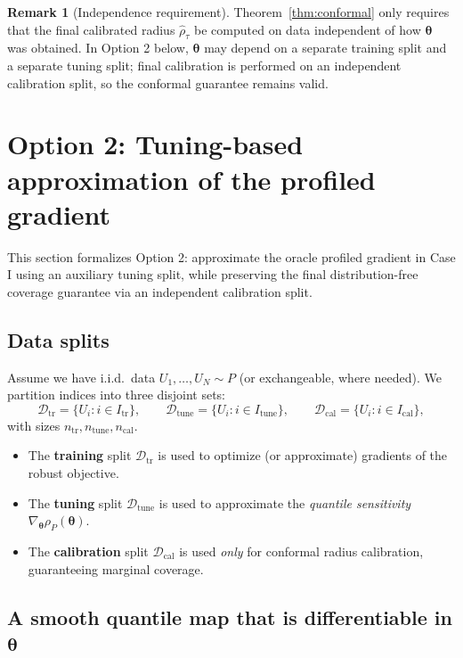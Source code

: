 \documentclass[11pt]{article}
\newcommand{\cD}{\mathcal{D}}
\newcommand{\btheta}{\bm{\theta}}
\theoremstyle{plain}
\theoremstyle{definition}
\newtheorem{remark}[theorem]{Remark}
\begin{document}
\begin{remark}[Independence requirement]\label{rem:indep}
Theorem~\ref{thm:conformal} only requires that the final calibrated radius $\hat\rho_\tau$ be computed on data independent of how $\btheta$ was obtained.
In Option 2 below, $\btheta$ may depend on a separate training split and a separate tuning split; final calibration is performed on an independent calibration split, so the conformal guarantee remains valid.
\end{remark}

\section{Option 2: Tuning-based approximation of the profiled gradient}

This section formalizes Option 2: approximate the oracle profiled gradient in Case I using an auxiliary tuning split, while preserving the final distribution-free coverage guarantee via an independent calibration split.

\subsection{Data splits}

Assume we have i.i.d.\ data $U_1,\dots,U_N\sim P$ (or exchangeable, where needed).
We partition indices into three disjoint sets:
\[
\cD_{\mathrm{tr}}=\{U_i: i\in I_{\mathrm{tr}}\},\qquad
\cD_{\mathrm{tune}}=\{U_i: i\in I_{\mathrm{tune}}\},\qquad
\cD_{\mathrm{cal}}=\{U_i: i\in I_{\mathrm{cal}}\},
\]
with sizes $n_{\mathrm{tr}}, n_{\mathrm{tune}}, n_{\mathrm{cal}}$.

\begin{itemize}[leftmargin=2em, itemsep=1pt]
\item The \textbf{training} split $\cD_{\mathrm{tr}}$ is used to optimize (or approximate) gradients of the robust objective.
\item The \textbf{tuning} split $\cD_{\mathrm{tune}}$ is used to approximate the \emph{quantile sensitivity} $\nabla_{\btheta}\rho_P(\btheta)$.
\item The \textbf{calibration} split $\cD_{\mathrm{cal}}$ is used \emph{only} for conformal radius calibration, guaranteeing marginal coverage.
\end{itemize}

\subsection{A smooth quantile map that is differentiable in $\btheta$}
\end{document}
